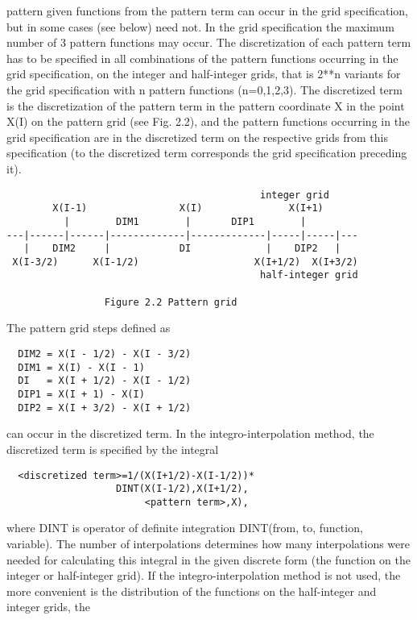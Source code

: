 pattern  given  functions  from  the  pattern term can occur in the grid
specification, but in some cases  (see  below)  need  not.  In  the grid
specification the  maximum number  of 3 pattern functions may occur. The
discretization  of  each  pattern  term  has  to  be  specified  in  all
combinations   of   the   pattern   functions   occurring  in  the  grid
specification, on the  integer  and  half-integer  grids,  that  is 2**n
variants   for   the   grid   specification  with  n  pattern  functions
(n=0,1,2,3). The discretized term is the  discretization of  the pattern
term in  the pattern  coordinate X in the point X(I) on the pattern grid
(see  Fig.  2.2),  and  the  pattern  functions  occurring  in  the grid
specification are  in the  discretized term on the respective grids from
this  specification  (to  the  discretized  term  corresponds  the  grid
specification preceding it).
{\small\begin{verbatim}
                                            integer grid
        X(I-1)                X(I)               X(I+1)
          |        DIM1        |       DIP1        |
---|------|------|-------------|-------------|-----|-----|---
   |    DIM2     |            DI             |    DIP2   |
 X(I-3/2)      X(I-1/2)                    X(I+1/2)  X(I+3/2)
                                            half-integer grid

                 Figure 2.2 Pattern grid
\end{verbatim}}
The pattern grid steps defined as
\begin{verbatim}
  DIM2 = X(I - 1/2) - X(I - 3/2)
  DIM1 = X(I) - X(I - 1)
  DI   = X(I + 1/2) - X(I - 1/2)
  DIP1 = X(I + 1) - X(I)
  DIP2 = X(I + 3/2) - X(I + 1/2)
\end{verbatim}
can occur in the discretized term.
     In  the  integro-interpolation  method,  the  discretized  term  is
specified by the integral
\begin{verbatim}
  <discretized term>=1/(X(I+1/2)-X(I-1/2))*
                   DINT(X(I-1/2),X(I+1/2),
                        <pattern term>,X),
\end{verbatim}
where DINT is operator of definite integration DINT(from,  to, function,
variable).   The   number   of   interpolations   determines   how  many
interpolations were needed for  calculating this  integral in  the given
discrete form (the function on the integer or half-integer grid). If the
integro-interpolation method is not used,  the  more  convenient  is the
distribution of the functions on the half-integer and integer grids, the
